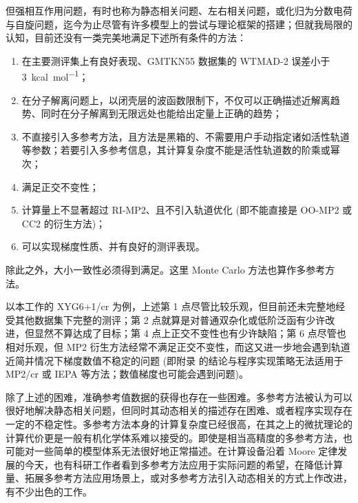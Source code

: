 但强相互作用问题，有时也称为静态相关问题\cite{Cremer-Cremer.MP.2001}、左右相关问题\cite{Handy-Cohen.MP.2001, Cohen-Handy.MP.2001}，或化归为分数电荷与自旋问题\cite{Cohen-Yang.S.2008, Cohen-Yang.JCP.2008, Mori-Sanchez-Yang.PRL.2009}，迄今为止尽管有许多模型上的尝试与理论框架的搭建\cite{Hesselmann-Goerling.PRL.2011, Lan-Yanai.JCP.2013, Mezei-Kallay.JCTC.2015, Zhang-Scheffler.NJP.2016, Goerling-Goerling.PRB.2019, Shee-Head-Gordon.JPCL.2021, Zhang-Xu.JPCL.2021, Kirkpatrick-Cohen.S.2021, Santra-Martin.JPCL.2022}；但就我局限的认知，目前还没有一类完美地满足下述所有条件的方法：
\begin{enumerate}[nosep]
    \item 在主要测评集上有良好表现、GMTKN55 数据集的 WTMAD-2 误差小于 \SI{3}{kcal.mol^{-1}}；
    \item 在分子解离问题上，以闭壳层的波函数限制下，不仅可以正确描述近解离趋势、同时在分子解离到无限远处也能给出定量上正确的趋势；
    \item 不直接引入多参考方法，且方法是黑箱的、不需要用户手动指定诸如活性轨道等参数；若要引入多参考信息，其计算复杂度不能是活性轨道数的阶乘或幂次；
    \item 满足正交不变性；
    \item 计算量上不显著超过 RI-MP2、且不引入轨道优化 (即不能直接是 OO-MP2 或 CC2 的衍生方法)；
    \item 可以实现梯度性质、并有良好的测评表现。
\end{enumerate}
除此之外，大小一致性必须得到满足。这里 Monte Carlo 方法也算作多参考方法。

以本工作的 XYG6+1/cr 为例，上述第 1 点尽管比较乐观，但目前还未完整地经受其他数据集下完整的测评；第 2 点就算是对普通双杂化或低阶泛函有少许改进，但显然不算达成了目标；第 4 点上正交不变性也有少许缺陷；第 6 点尽管也相对乐观，但 MP2 衍生方法经常不满足正交不变性，而这又进一步地会遇到轨道近简并情况下梯度数值不稳定的问题 (即附录  的结论与程序实现策略无法适用于 MP2/cr 或 IEPA 等方法；数值梯度也可能会遇到问题)。

除了上述的困难，准确参考值数据的获得也存在一些困难。多参考方法被认为可以很好地解决静态相关问题，但同时其动态相关的描述存在困难、或者程序实现存在一定的不稳定性。多参考方法本身的计算复杂度已经很高，在其之上的微扰理论的计算代价更是一般有机化学体系难以接受的\cite{Finley-Serrano-Andres.CPL.1998, Angeli-Malrieu.JCP.2001, Angeli-Malrieu.CPL.2001, Malmqvist-Gagliardi.JCP.2008, Pulay-Pulay.IJQC.2011}。即使是相当高精度的多参考方法，也可能对一些简单的模型体系无法很好地正常描述\cite{Vancoillie-Veryazov.JCTC.2016}。在计算设备沿着 Moore 定律发展的今天，也有科研工作者看到多参考方法应用于实际问题的希望，在降低计算量、拓展多参考方法应用场景上\cite{Ren-Shuai.WCMS.2022, Li-Chen.PRR.2022, Xiang-Li.JCTC.2024}，或对多参考方法引入动态相关的方式上作改进\cite{Mitra-Gagliardi.JCTC.2023, Feng-Xu.chemRxiv.2023}，有不少出色的工作。

